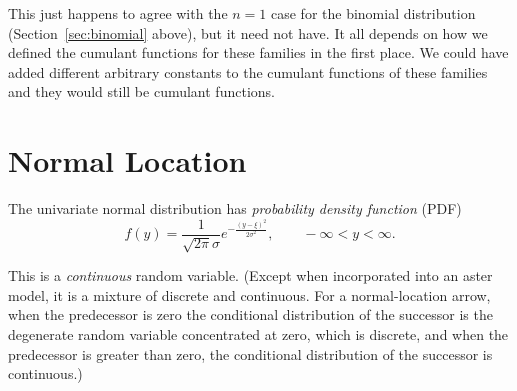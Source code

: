 This just happens to agree with the $n = 1$ case for the binomial
distribution (Section~\ref{sec:binomial} above), but it need not have.
It all depends on how we defined the cumulant functions for these families
in the first place.  We could have added different arbitrary constants
to the cumulant functions of these families and they would still be
cumulant functions.

\section{Normal Location}

\begin{sloppypar}
The univariate normal distribution has \emph{probability density function}
(PDF)
\begin{equation} \label{eq:normal-pdf}
   f(y) = \frac{1}{\sqrt{2 \pi} \sigma} e^{- \frac{(y - \xi)^2}{2 \sigma^2}},
   \qquad - \infty < y < \infty.
\end{equation}
\end{sloppypar}

This is a \emph{continuous} random variable.
(Except when incorporated into an aster model, it is a mixture of discrete
and continuous.  For a normal-location arrow, when the predecessor is zero
the conditional distribution of the successor is the degenerate random variable
concentrated at zero, which is discrete, and when the predecessor is greater
than zero, the conditional distribution of the successor is continuous.)

